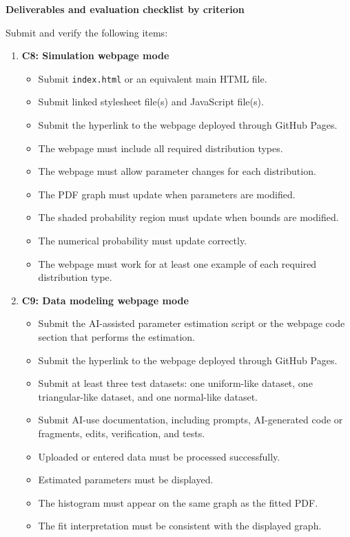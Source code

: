 \documentclass[12pt]{article}
\newcommand{\SubsectionBox}[1]{%
	\noindent\colorbox{gray!30}{%
		\parbox{\linewidth}{\textbf{#1}}%
	}\par\vspace{0.35cm}%
}
\begin{document}
	\SubsectionBox{Deliverables and evaluation checklist by criterion}
	Submit and verify the following items:
	\begin{enumerate}
		\item \textbf{C8: Simulation webpage mode}
		\begin{itemize}
			\item Submit \texttt{index.html} or an equivalent main HTML file.
			\item Submit linked stylesheet file(s) and JavaScript file(s).
			\item Submit the hyperlink to the webpage deployed through GitHub Pages.
			\item The webpage must include all required distribution types.
			\item The webpage must allow parameter changes for each distribution.
			\item The PDF graph must update when parameters are modified.
			\item The shaded probability region must update when bounds are modified.
			\item The numerical probability must update correctly.
			\item The webpage must work for at least one example of each required distribution type.
		\end{itemize}
		
		\item \textbf{C9: Data modeling webpage mode}
		\begin{itemize}
			\item Submit the AI-assisted parameter estimation script or the webpage code section that performs the estimation.
			\item Submit the hyperlink to the webpage deployed through GitHub Pages.
			\item Submit at least three test datasets: one uniform-like dataset, one triangular-like dataset, and one normal-like dataset.
			\item Submit AI-use documentation, including prompts, AI-generated code or fragments, edits, verification, and tests.
			\item Uploaded or entered data must be processed successfully.
			\item Estimated parameters must be displayed.
			\item The histogram must appear on the same graph as the fitted PDF.
			\item The fit interpretation must be consistent with the displayed graph.
		\end{itemize}
		

\end{enumerate}
\end{document}
